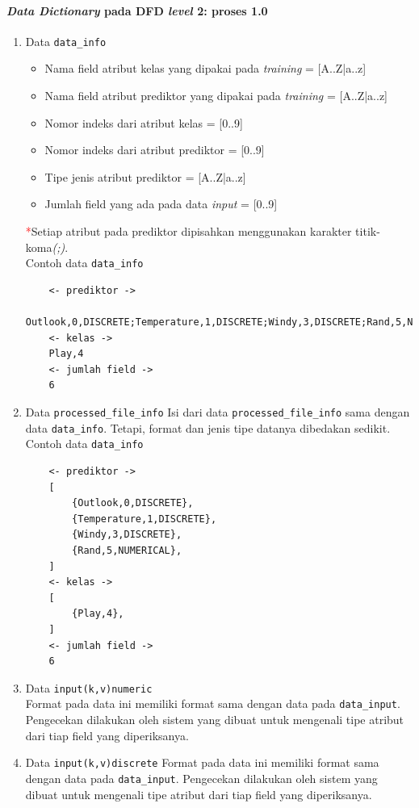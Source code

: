 \paragraph{\textit{Data Dictionary} pada DFD \textit{level} 2: proses 1.0}
\begin{enumerate}
	\item{Data \verb|data_info|}
		\begin{itemize}
			\item Nama field atribut kelas yang dipakai pada \textit{training} = [A..Z|a..z]
			\item Nama field atribut prediktor yang dipakai pada \textit{training} = [A..Z|a..z]
			\item Nomor indeks dari atribut kelas = [0..9]
			\item Nomor indeks dari atribut prediktor = [0..9]
			\item Tipe jenis atribut prediktor = [A..Z|a..z]
			\item Jumlah field yang ada pada data \textit{input} = [0..9]
		\end{itemize}
		 \textcolor{red}{*}Setiap atribut pada prediktor dipisahkan menggunakan karakter titik-koma\textit{(;)}.\\
	Contoh data \verb|data_info|
	\begin{lstlisting}
	<- prediktor ->
	Outlook,0,DISCRETE;Temperature,1,DISCRETE;Windy,3,DISCRETE;Rand,5,NUMERICAL
	<- kelas ->
	Play,4
	<- jumlah field ->
	6
	\end{lstlisting}
	
	\item{Data \verb|processed_file_info|}
	Isi dari data \verb|processed_file_info| sama dengan data \verb|data_info|. Tetapi, format dan jenis tipe datanya dibedakan sedikit.
	Contoh data \verb|data_info|
	\begin{lstlisting}
	<- prediktor ->
	[
		{Outlook,0,DISCRETE},
		{Temperature,1,DISCRETE},
		{Windy,3,DISCRETE},
		{Rand,5,NUMERICAL},
	]
	<- kelas ->
	[
		{Play,4},
	]
	<- jumlah field ->
	6
	\end{lstlisting}	
	
	\item{Data \verb|input(k,v)numeric|}\\
	Format pada data ini memiliki format sama dengan data pada \verb|data_input|. Pengecekan dilakukan oleh sistem yang dibuat untuk mengenali tipe atribut dari tiap field yang diperiksanya.	
	
	\item{Data \verb|input(k,v)discrete|}
	Format pada data ini memiliki format sama dengan data pada \verb|data_input|. Pengecekan dilakukan oleh sistem yang dibuat untuk mengenali tipe atribut dari tiap field yang diperiksanya.


\end{enumerate}
